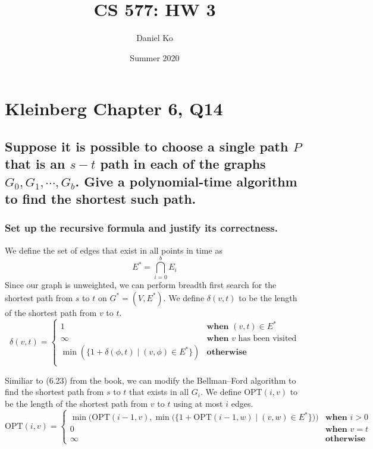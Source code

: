 \documentclass[11pt]{scrartcl}
\title{CS 577: HW 3}
\author{Daniel Ko}
\date{Summer 2020}
\newcommand{\opt}{\text{OPT}}
\begin{document}
\maketitle

\section{
  Kleinberg Chapter 6, Q14
 }

\subsection{
	Suppose it is possible to choose a single path $P$ that is an $s-t$ path in
	each of the graphs $G_0, G_1, \cdots , G_b$. Give a polynomial-time algorithm
	to find the shortest such path.
}
\subsubsection{
	Set up the recursive formula and justify its correctness.
}
We define the set of edges that exist in all points in time as $$E^* = \bigcap_{i=0}^{b} E_i$$
Since our graph is unweighted, we can perform breadth first search for the shortest path from 
$s$ to $t$ on $G^* = (V, E^*)$. We define $\delta(v,t)$ to be the length of the shortest
path from $v$ to $t$. 
$$
\delta(v,t) = 
\begin{cases} 
	1 & \textbf{when } (v, t) \in E^*\\
	\infty & \textbf{when } v \text{ has been visited}\\
	\min(\{ 1 + \delta(\phi,t) \mid (v,\phi) \in E^*\})  & \textbf{otherwise}\\ 
\end{cases}
$$

\iffalse
Similiar to (6.23) from the book, we can modify the Bellman–Ford algorithm 
to find the shortest path from $s$ to $t$ that exists in all $G_i$. We define $\opt(i,v)$ to be the length of the shortest
path from $v$ to $t$ using at most $i$ edges. 
$$\opt(i,v) = 
\begin{cases} 
	\min \bigg(\opt(i-1,v),\min\Big(\{1 + \opt(i-1,w) \mid  (v,w) \in E^*\}\Big) \bigg) & \textbf{when } i > 0 \\ 
	0 & \textbf{when } v = t\\
	\infty & \textbf{otherwise}
\end{cases}
$$
\end{document}
